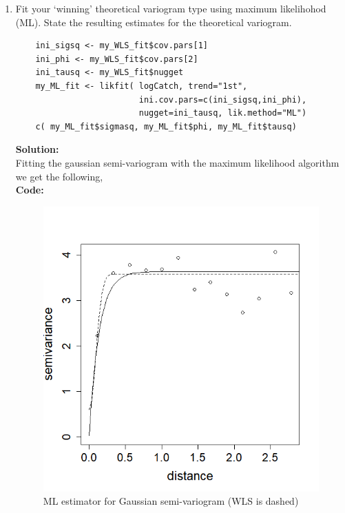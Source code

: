 \documentclass[12pt]{article}
\makeatletter
\theoremstyle{homework}
\newenvironment{exercise}[1]
{\def\@currentlabel{#1}\exercisecore}
{\endexercisecore}
\newcommand{\localhead}[1]{\par\smallskip\noindent\textbf{#1}\nobreak\\}%
\newcommand\solution{\localhead{Solution:}}
\makeatother
\begin{document}
\begin{exercise}{4}
\begin{enumerate}
  \item Fit your `winning' theoretical variogram type
  using  maximum likelihohod (ML).  State the resulting estimates for the theoretical variogram.
  \begin{verbatim}
    ini_sigsq <- my_WLS_fit$cov.pars[1]
    ini_phi <- my_WLS_fit$cov.pars[2]
    ini_tausq <- my_WLS_fit$nugget
    my_ML_fit <- likfit( logCatch, trend="1st",
                         ini.cov.pars=c(ini_sigsq,ini_phi),
                         nugget=ini_tausq, lik.method="ML")
    c( my_ML_fit$sigmasq, my_ML_fit$phi, my_ML_fit$tausq)
  \end{verbatim}
  \solution Fitting the gaussian semi-variogram with the maximum likelihood algorithm we get the following, \\
  \textbf{Code:}
  \begin{center}
  
  \end{center}
  \begin{figure}[H]
    \begin{center}
      \caption{ML estimator for Gaussian semi-variogram (WLS is dashed)}
    \includegraphics[width = .70\textwidth]{Rplot07.png}
    \end{center}
  \end{figure}

  













  
  

\end{enumerate}
\end{exercise}
\end{document}
